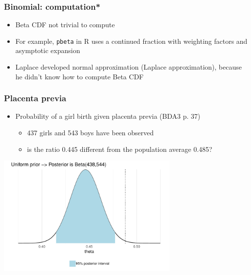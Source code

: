 \documentclass[10pt,handout]{beamer}
\begin{document}
\begin{frame}
  \frametitle{Binomial: computation*}

  \begin{itemize}
  \item Beta CDF not trivial to compute
  \item For example, {\tt pbeta} in R uses a continued fraction with
    weighting factors and asymptotic expansion
  \item Laplace developed normal approximation (Laplace
    approximation), because he didn't know how to compute Beta CDF
  \end{itemize}

\end{frame}

\begin{frame}
  \frametitle{Placenta previa}

  \begin{itemize}
  \item Probability of a girl birth given placenta previa (BDA3 p. 37)
    \begin{itemize}
    \item 437 girls and 543 boys have been observed
    \item is the ratio 0.445 different from the population average 0.485?
    \end{itemize}
  \end{itemize}
  \pause
  \includegraphics[width=9cm]{figs/demo2_1.pdf}
\end{frame}

\end{document}
